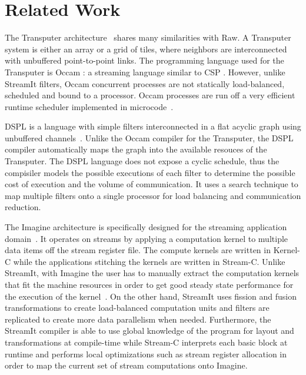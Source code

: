 \section{Related Work}
\label{sec:related}

The Transputer architecture~\cite{transputer88} shares many
similarities with Raw.  A Transputer system is either an array or a
grid of tiles, where neighbors are interconnected with unbuffered
point-to-point links. The programming language used for the Transputer
is Occam \cite{occammanual}: a streaming language similar to CSP
\cite{Hoare78}.  However, unlike StreamIt filters, Occam concurrent
processes are not statically load-balanced, scheduled and bound to a
processor. Occam processes are run off a very efficient runtime
scheduler implemented in microcode~\cite{may87communicating}.

DSPL is a language with simple filters interconnected in a flat acyclic
graph using unbuffered channels~\cite{Thiel93}.  Unlike the Occam
compiler for the Transputer, the DSPL compiler automatically maps the
graph into the available resouces of the Transputer. The DSPL language
does not expose a cyclic schedule, thus the compisiler models the
possible executions of each filter to determine the possible cost of
execution and the volume of communication. It uses a search technique
to map multiple filters onto a single processor for load balancing and
communication reduction. 

The Imagine architecture is specifically designed for the streaming
application domain~\cite{rixner98bandwidthefficient}.  It operates on
streams by applying a computation kernel to multiple data items off
the stream register file.  The compute kernels are written in Kernel-C
while the applications stitching the kernels are written in Stream-C.
Unlike StreamIt, with Imagine the user has to manually extract the
computation kernels that fit the machine resources in order to get
good steady state performance for the execution of the
kernel~\cite{kapasi:2001:ss}.  On the other hand, StreamIt uses
fission and fusion transformations to create load-balanced computation
units and filters are replicated to create more data parallelism when
needed.  Furthermore, the StreamIt compiler is able to use global
knowledge of the program for layout and transformations at
compile-time while Stream-C interprets each basic block at runtime and
performs local optimizations such as stream register allocation in
order to map the current set of stream computations onto Imagine.

